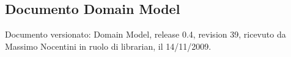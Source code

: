 \subsection{Documento Domain Model}
Documento versionato: Domain Model, release 0.4, revision 39, ricevuto da
Massimo Nocentini in ruolo di librarian, il 14/11/2009.
